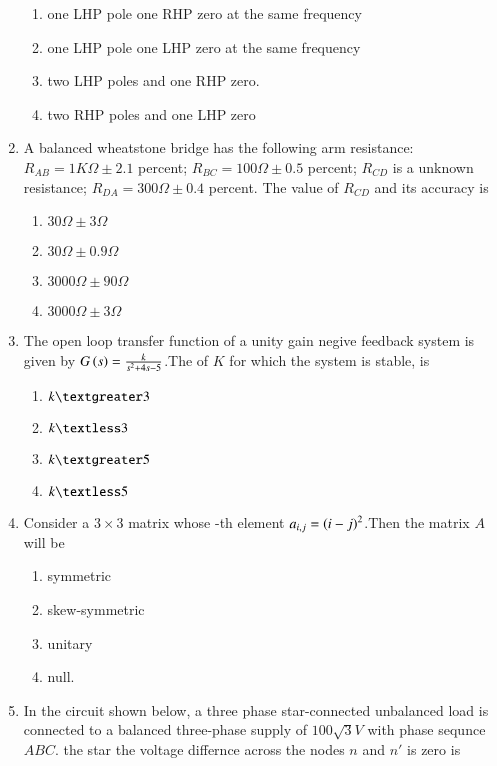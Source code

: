 \documentclass[journal]{IEEEtran}
\begin{document}
\begin{enumerate}
\begin{figure}[!ht]
\label{fig:my_label}
\end{figure}
\begin{enumerate}
    \item one LHP pole one RHP zero at the same frequency  
    \item one LHP pole one LHP zero at the same frequency
    \item two LHP poles and one RHP zero.
    \item two RHP poles and one LHP zero
\end{enumerate}
\item A balanced wheatstone bridge has the following arm resistance:\\
$R_{AB}=1K\Omega \pm 2.1$ percent; $R_{BC}=100\Omega \pm 0.5$ percent; $R_{CD}$ is a unknown resistance; $R_{DA}=300\Omega \pm 0.4$ percent. The value of $R_{CD}$ and its accuracy is 
\begin{enumerate}
    \item $30\Omega \pm 3\Omega$
    \item $30\Omega \pm 0.9\Omega$
    \item $3000\Omega \pm 90\Omega$
    \item $3000\Omega \pm 3\Omega$
\end{enumerate}
\item The open loop transfer function of a unity gain negive feedback system is given by $G\left(s\right)=\frac{k}{s^2+4s-5}$.The of $K$ for which the system is stable, is 
\begin{enumerate}
    \item $k\textgreater 3$
    \item $k\textless 3$
    \item $k\textgreater 5$
    \item $k\textless 5$
\end{enumerate}
\item Consider a $3 \times 3$ matrix whose -th element $a_{i,j}=\left(i-j\right)^2$.Then the matrix $A$ will be 
\begin{enumerate}
    \item symmetric
    \item skew-symmetric
    \item unitary
    \item null.
\end{enumerate}
\item In the circuit shown below, a three phase star-connected unbalanced load is connected to a balanced three-phase supply of $100\sqrt{3}V$ with phase sequnce $ABC$. the star the voltage differnce across the nodes $n$ and $n\prime$ is zero is  \\\\\\
\begin{figure}[!ht]
\centering
{}
\end{figure}
\end{enumerate}
\end{document}
